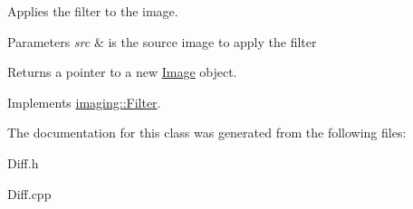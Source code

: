 Applies the filter to the image.


\begin{DoxyParams}{Parameters}
{\em src} & is the source image to apply the filter\\
\hline
\end{DoxyParams}
\begin{DoxyReturn}{Returns}
a pointer to a new \hyperlink{classimaging_1_1_image}{Image} object. 
\end{DoxyReturn}


Implements \hyperlink{classimaging_1_1_filter_ab153f2e4e89dd744806299a29da8289b}{imaging\+::\+Filter}.



The documentation for this class was generated from the following files\+:\begin{DoxyCompactItemize}
\item 
Diff.\+h\item 
Diff.\+cpp\end{DoxyCompactItemize}
